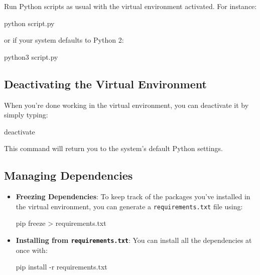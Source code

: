 \documentclass[
  letterpaper,
  DIV=11,
  numbers=noendperiod]{scrreprt}
\newenvironment{Shaded}{\begin{snugshade}}{\end{snugshade}}
\newcommand{\AttributeTok}[1]{\textcolor[rgb]{0.40,0.45,0.13}{#1}}
\newcommand{\ExtensionTok}[1]{\textcolor[rgb]{0.00,0.23,0.31}{#1}}
\newcommand{\NormalTok}[1]{\textcolor[rgb]{0.00,0.23,0.31}{#1}}
\newcommand{\OperatorTok}[1]{\textcolor[rgb]{0.37,0.37,0.37}{#1}}
\begin{document}
Run Python scripts as usual with the virtual environment activated. For
instance:

\begin{Shaded}
\begin{Highlighting}[]
\ExtensionTok{python}\NormalTok{ script.py}
\end{Highlighting}
\end{Shaded}

or if your system defaults to Python 2:

\begin{Shaded}
\begin{Highlighting}[]
\ExtensionTok{python3}\NormalTok{ script.py}
\end{Highlighting}
\end{Shaded}

\subsection{Deactivating the Virtual
Environment}\label{deactivating-the-virtual-environment}

When you're done working in the virtual environment, you can deactivate
it by simply typing:

\begin{Shaded}
\begin{Highlighting}[]
\ExtensionTok{deactivate}
\end{Highlighting}
\end{Shaded}

This command will return you to the system's default Python settings.

\subsection{Managing Dependencies}\label{managing-dependencies}

\begin{itemize}
\item
  \textbf{Freezing Dependencies}: To keep track of the packages you've
  installed in the virtual environment, you can generate a
  \texttt{requirements.txt} file using:

\begin{Shaded}
\begin{Highlighting}[]
\ExtensionTok{pip}\NormalTok{ freeze }\OperatorTok{\textgreater{}}\NormalTok{ requirements.txt}
\end{Highlighting}
\end{Shaded}
\item
  \textbf{Installing from \texttt{requirements.txt}}: You can install
  all the dependencies at once with:

\begin{Shaded}
\begin{Highlighting}[]
\ExtensionTok{pip}\NormalTok{ install }\AttributeTok{{-}r}\NormalTok{ requirements.txt}
\end{Highlighting}
\end{Shaded}
\end{itemize}
\end{document}
